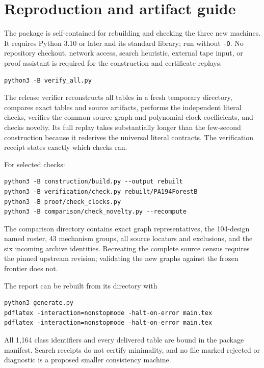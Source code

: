 \documentclass[11pt]{article}
\newcommand{\code}[1]{\texttt{#1}}
\begin{document}
\section{Reproduction and artifact guide}

The package is self-contained for rebuilding and checking the three
new machines. It requires Python 3.10 or later and its standard
library; run without \code{-O}. No repository checkout, network
access, search heuristic, external tape input, or proof assistant
is required for the construction and certificate replays.

\begin{verbatim}
python3 -B verify_all.py
\end{verbatim}

The release verifier reconstructs all tables in a fresh temporary
directory, compares exact tables and source artifacts, performs the
independent literal checks, verifies the common source graph and
polynomial-clock coefficients, and checks novelty. Its full replay
takes substantially longer than the few-second construction because
it rederives the universal literal contracts. The verification
receipt states exactly which checks ran.

For selected checks:
\begin{verbatim}
python3 -B construction/build.py --output rebuilt
python3 -B verification/check.py rebuilt/PA194ForestB
python3 -B proof/check_clocks.py
python3 -B comparison/check_novelty.py --recompute
\end{verbatim}

The comparison directory contains exact graph representatives,
the 104-design named roster, 43 mechanism groups, all source
locators and exclusions, and the six incoming archive identities.
Recreating the complete source census requires the pinned upstream
revision; validating the new graphs against the frozen frontier
does not.

The report can be rebuilt from its directory with
\begin{verbatim}
python3 generate.py
pdflatex -interaction=nonstopmode -halt-on-error main.tex
pdflatex -interaction=nonstopmode -halt-on-error main.tex
\end{verbatim}
All 1,164 class identifiers and every delivered table are bound in
the package manifest. Search receipts do not certify minimality,
and no file marked rejected or diagnostic is a proposed smaller
consistency machine.
\end{document}
